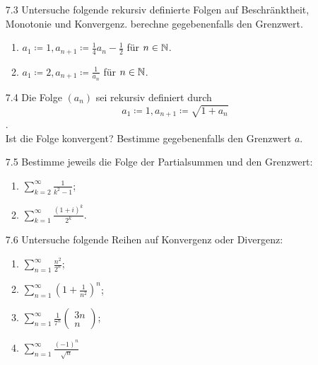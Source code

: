 \documentclass{HM}
\begin{document}
\begin{enumerate}
\item[7.3] Untersuche  folgende rekursiv definierte Folgen auf Beschränktheit, Monotonie und Konvergenz. berechne gegebenenfalls den Grenzwert.
\begin{enumerate}
\item $a_1\coloneqq 1, a_{n+1}\coloneqq \frac{1}{4}a_n - \frac{1}{2}$ für $n\in\mathbb{N}$.
\item $a_1\coloneqq 2, a_{n+1}\coloneqq \frac{1}{a_n}$ für $n\in\mathbb{N}$.
\end{enumerate}
\item[7.4] Die Folge $(a_n)$ sei rekursiv definiert durch
$$a_1\coloneqq 1, a_{n+1}\coloneqq\sqrt{1+a_n}$$.\\
Ist die Folge konvergent? Bestimme gegebenenfalls den Grenzwert $a$.\\
\item[7.5] Bestimme jeweils die Folge der Partialsummen und den Grenzwert:
\begin{enumerate}
\item $\sum\limits_{k=2}^\infty\frac{1}{k^2-1}$;
\item $\sum\limits_{k=1}^\infty\frac{(1+i)^k}{2^k}$.
\end{enumerate}
\item[7.6] Untersuche folgende Reihen auf Konvergenz oder Divergenz:
\begin{enumerate}
\item $\sum\limits_{n=1}^\infty\frac{n^2}{2^n}$;
\item $\sum\limits_{n=1}^\infty(1+\frac{1}{n^2})^n$;
\item $\sum\limits_{n=1}^\infty\frac{1}{7^n}\begin{pmatrix}
3n\\
n
\end{pmatrix}$;
\item $\sum\limits_{n=1}^\infty\frac{(-1)^n}{\sqrt{n}}$
\end{enumerate}

\end{enumerate}
\end{document}
